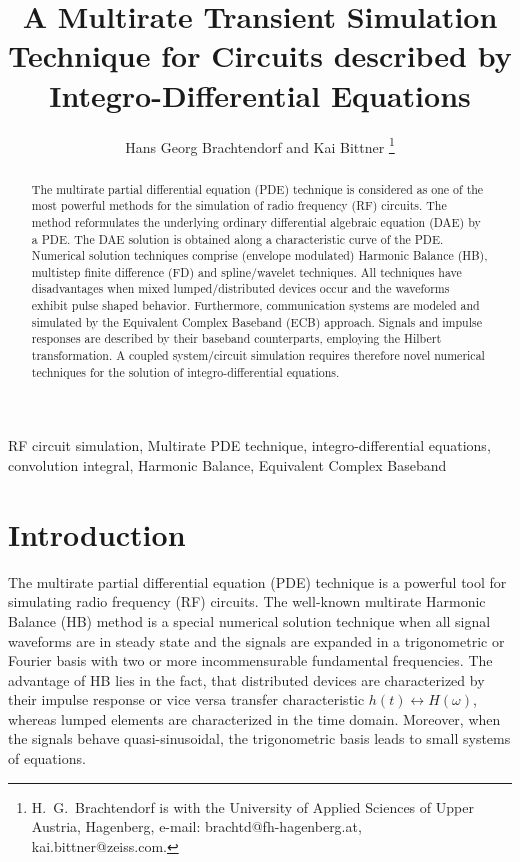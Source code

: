 \documentclass[journal]{IEEEtran}
\begin{document}
\title{A Multirate Transient Simulation Technique for Circuits described by Integro-Differential Equations}

\author{Hans Georg Brachtendorf and	Kai Bittner
	\thanks{H.~G.~Brachtendorf
		is with the University
		of Applied Sciences of Upper Austria, Hagenberg, e-mail: brachtd@fh-hagenberg.at, kai.bittner@zeiss.com.}}




\maketitle

\begin{abstract}
The multirate partial differential equation (PDE) technique is considered
as one of the most powerful methods for the simulation of radio frequency
(RF) circuits. The method reformulates the underlying ordinary differential
algebraic equation (DAE) by a PDE. The DAE solution is obtained along a 
characteristic curve of the PDE. Numerical solution techniques comprise 
(envelope modulated) Harmonic Balance (HB), multistep finite difference (FD)
and spline/wavelet techniques. All techniques have disadvantages when mixed
lumped/distributed devices occur and the waveforms exhibit pulse shaped behavior. 
Furthermore, communication systems are modeled and simulated by the Equivalent 
Complex Baseband (ECB) approach. Signals and impulse responses are described
 by 
their baseband counterparts, employing the Hilbert transformation. A coupled 
system/circuit simulation requires therefore novel numerical techniques for 
the solution of integro-differential equations.
\end{abstract}

\begin{IEEEkeywords}
RF circuit simulation, Multirate PDE technique, integro-differential equations, convolution integral,
Harmonic Balance, Equivalent Complex Baseband
\end{IEEEkeywords}


\IEEEpeerreviewmaketitle

\section{Introduction}

The multirate partial differential equation (PDE) technique \cite{BWL+96,Roy01,Roy97,NL96,PG02} is 
a powerful tool for simulating radio frequency (RF) circuits. The well-known 
multirate Harmonic Balance (HB) method is a special numerical solution technique
 when all signal waveforms
are in steady state and the signals are expanded in a trigonometric or Fourier basis with two or more
incommensurable fundamental frequencies. The advantage of HB lies in the fact, that distributed devices
are characterized by their impulse response or vice versa transfer characteristic
$h(t) \leftrightarrow H(\omega)$, whereas lumped elements are characterized in the time domain.
Moreover, when the signals behave quasi-sinusoidal, the trigonometric basis leads to small systems of
equations. 
\end{document}
